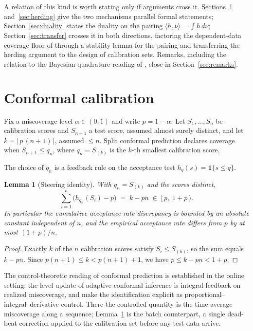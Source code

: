 \documentclass[11pt]{article}
\newtheorem{lemma}{Lemma}
\theoremstyle{remark}
\newcommand{\ind}[1]{\mathbf 1\{#1\}}
\begin{document}
A relation of this kind is worth stating only if arguments cross it. Sections~\ref{sec:conformal}
and~\ref{sec:herding} give the two mechanisms parallel formal statements;
Section~\ref{sec:duality} states the duality on the pairing
$\langle h,\nu\rangle=\int h\,d\nu$; Section~\ref{sec:transfer} crosses it in both directions,
factoring the dependent-data coverage floor of \citet{barberpananjady2026} through a stability
lemma for the pairing and transferring the herding argument to the design of calibration sets.
Remarks, including the relation to the Bayesian-quadrature reading of \citet{snellgriffiths2025},
close in Section~\ref{sec:remarks}.

\section{Conformal calibration}\label{sec:conformal}

Fix a miscoverage level $\alpha\in(0,1)$ and write $p=1-\alpha$. Let $S_1,\dots,S_n$ be
calibration scores and $S_{n+1}$ a test score, assumed almost surely distinct, and let
$k=\lceil p\,(n+1)\rceil$, assumed $\le n$. Split conformal prediction declares coverage when
$S_{n+1}\le q_n$, where $q_n=S_{(k)}$ is the $k$-th smallest calibration score.

The choice of $q_n$ is a feedback rule on the acceptance test $h_q(s)=\ind{s\le q}$.

\begin{lemma}[Steering identity]\label{lem:steer}
With $q_n=S_{(k)}$ and the scores distinct,
\[
\sum_{i=1}^{n}\bigl(h_{q_n}(S_i)-p\bigr)\;=\;k-pn\;\in\;[\,p,\;1+p\,).
\]
In particular the cumulative acceptance-rate discrepancy is bounded by an absolute constant
independent of $n$, and the empirical acceptance rate differs from $p$ by at most $(1+p)/n$.
\end{lemma}

\begin{proof}
Exactly $k$ of the $n$ calibration scores satisfy $S_i\le S_{(k)}$, so the sum equals $k-pn$.
Since $p(n+1)\le k<p(n+1)+1$, we have $p\le k-pn<1+p$.
\end{proof}

The control-theoretic reading of conformal prediction is established in the online setting: the
level update of adaptive conformal inference \citep{gibbscandes2021} is integral feedback on
realized miscoverage, and \citet{angelopoulos2023pid} make the identification explicit as
proportional--integral--derivative control. There the controlled quantity is the time-average
miscoverage along a sequence; Lemma~\ref{lem:steer} is the batch counterpart, a single dead-beat
correction applied to the calibration set before any test data arrive.
\end{document}
